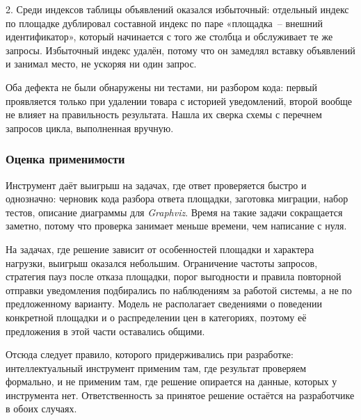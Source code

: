2. Среди индексов таблицы объявлений оказался избыточный: отдельный индекс по площадке дублировал составной индекс по паре «площадка~-- внешний идентификатор», который начинается с того же столбца и обслуживает те же запросы. Избыточный индекс удалён, потому что он замедлял вставку объявлений и занимал место, не ускоряя ни один запрос.

Оба дефекта не были обнаружены ни тестами, ни разбором кода: первый проявляется только при удалении товара с историей уведомлений, второй вообще не влияет на правильность результата. Нашла их сверка схемы с перечнем запросов цикла, выполненная вручную.

\subsubsection{Оценка применимости}

Инструмент даёт выигрыш на задачах, где ответ проверяется быстро и однозначно: черновик кода разбора ответа площадки, заготовка миграции, набор тестов, описание диаграммы для \textit{Graphviz}. Время на такие задачи сокращается заметно, потому что проверка занимает меньше времени, чем написание с нуля.

На задачах, где решение зависит от особенностей площадки и характера нагрузки, выигрыш оказался небольшим. Ограничение частоты запросов, стратегия пауз после отказа площадки, порог выгодности и правила повторной отправки уведомления подбирались по наблюдениям за работой системы, а не по предложенному варианту. Модель не располагает сведениями о поведении конкретной площадки и о распределении цен в категориях, поэтому её предложения в этой части оставались общими.

Отсюда следует правило, которого придерживались при разработке: интеллектуальный инструмент применим там, где результат проверяем формально, и не применим там, где решение опирается на данные, которых у инструмента нет. Ответственность за принятое решение остаётся на разработчике в обоих случаях.
